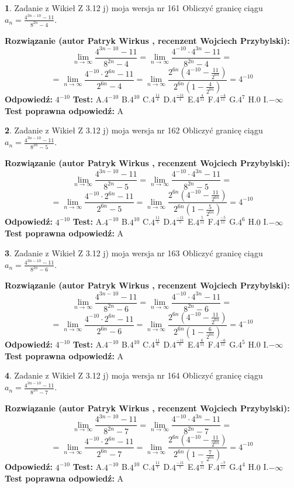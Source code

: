 \documentclass[12pt, a4paper]{article}
\theoremstyle{definition} %
\newtheorem{zad}{}
\newcommand{\zadStart}[1]{\begin{zad}#1\newline}
\newcommand{\zadStop}{\end{zad}}
\newcommand{\rozwStart}[2]{\noindent \textbf{Rozwiązanie (autor #1 , recenzent #2): }\newline}
\newcommand{\rozwStop}{\newline}
\newcommand{\odpStart}{\noindent \textbf{Odpowiedź:}\newline}
\newcommand{\odpStop}{\newline}
\newcommand{\testStart}{\noindent \textbf{Test:}\newline}
\newcommand{\testStop}{\newline}
\newcommand{\kluczStart}{\noindent \textbf{Test poprawna odpowiedź:}\newline}
\newcommand{\kluczStop}{\newline}
\begin{document}
\zadStart{Zadanie z Wikieł Z 3.12 j) moja wersja nr 161}
Obliczyć granicę ciągu $a_{n}=\frac{4^{3n-10}-11}{8^{2n}-4}$.
\zadStop
\rozwStart{Patryk Wirkus}{Wojciech Przybylski}
$$\lim\limits_{n\to\infty}\frac{4^{3n-10}-11}{8^{2n}-4}= \lim\limits_{n\to\infty}\frac{4^{-10} \cdot 4^{3n}-11}{8^{2n}-4}=$$
$$= \lim\limits_{n\to\infty}\frac{4^{-10} \cdot 2^{6n}-11}{2^{6n}-4}= \lim\limits_{n\to\infty}\frac{2^{6n}(4^{-10} - \frac{11}{2^{6n}})}{2^{6n}(1-\frac{4}{2^{6n}})}= 4^{-10}$$
\rozwStop
\odpStart
$4^{-10}$
\odpStop
\testStart
A.$4^{-10}$
B.$4^{10}$
C.$4^{\frac{11}{4}}$
D.$4^{\frac{-11}{4}}$
E.$4^{\frac{4}{11}}$
F.$4^{\frac{-4}{11}}$
G.$4^{7}$
H.$0$
I.$-\infty$
\testStop
\kluczStart
A
\kluczStop



\zadStart{Zadanie z Wikieł Z 3.12 j) moja wersja nr 162}
Obliczyć granicę ciągu $a_{n}=\frac{4^{3n-10}-11}{8^{2n}-5}$.
\zadStop
\rozwStart{Patryk Wirkus}{Wojciech Przybylski}
$$\lim\limits_{n\to\infty}\frac{4^{3n-10}-11}{8^{2n}-5}= \lim\limits_{n\to\infty}\frac{4^{-10} \cdot 4^{3n}-11}{8^{2n}-5}=$$
$$= \lim\limits_{n\to\infty}\frac{4^{-10} \cdot 2^{6n}-11}{2^{6n}-5}= \lim\limits_{n\to\infty}\frac{2^{6n}(4^{-10} - \frac{11}{2^{6n}})}{2^{6n}(1-\frac{5}{2^{6n}})}= 4^{-10}$$
\rozwStop
\odpStart
$4^{-10}$
\odpStop
\testStart
A.$4^{-10}$
B.$4^{10}$
C.$4^{\frac{11}{5}}$
D.$4^{\frac{-11}{5}}$
E.$4^{\frac{5}{11}}$
F.$4^{\frac{-5}{11}}$
G.$4^{6}$
H.$0$
I.$-\infty$
\testStop
\kluczStart
A
\kluczStop



\zadStart{Zadanie z Wikieł Z 3.12 j) moja wersja nr 163}
Obliczyć granicę ciągu $a_{n}=\frac{4^{3n-10}-11}{8^{2n}-6}$.
\zadStop
\rozwStart{Patryk Wirkus}{Wojciech Przybylski}
$$\lim\limits_{n\to\infty}\frac{4^{3n-10}-11}{8^{2n}-6}= \lim\limits_{n\to\infty}\frac{4^{-10} \cdot 4^{3n}-11}{8^{2n}-6}=$$
$$= \lim\limits_{n\to\infty}\frac{4^{-10} \cdot 2^{6n}-11}{2^{6n}-6}= \lim\limits_{n\to\infty}\frac{2^{6n}(4^{-10} - \frac{11}{2^{6n}})}{2^{6n}(1-\frac{6}{2^{6n}})}= 4^{-10}$$
\rozwStop
\odpStart
$4^{-10}$
\odpStop
\testStart
A.$4^{-10}$
B.$4^{10}$
C.$4^{\frac{11}{6}}$
D.$4^{\frac{-11}{6}}$
E.$4^{\frac{6}{11}}$
F.$4^{\frac{-6}{11}}$
G.$4^{5}$
H.$0$
I.$-\infty$
\testStop
\kluczStart
A
\kluczStop



\zadStart{Zadanie z Wikieł Z 3.12 j) moja wersja nr 164}
Obliczyć granicę ciągu $a_{n}=\frac{4^{3n-10}-11}{8^{2n}-7}$.
\zadStop
\rozwStart{Patryk Wirkus}{Wojciech Przybylski}
$$\lim\limits_{n\to\infty}\frac{4^{3n-10}-11}{8^{2n}-7}= \lim\limits_{n\to\infty}\frac{4^{-10} \cdot 4^{3n}-11}{8^{2n}-7}=$$
$$= \lim\limits_{n\to\infty}\frac{4^{-10} \cdot 2^{6n}-11}{2^{6n}-7}= \lim\limits_{n\to\infty}\frac{2^{6n}(4^{-10} - \frac{11}{2^{6n}})}{2^{6n}(1-\frac{7}{2^{6n}})}= 4^{-10}$$
\rozwStop
\odpStart
$4^{-10}$
\odpStop
\testStart
A.$4^{-10}$
B.$4^{10}$
C.$4^{\frac{11}{7}}$
D.$4^{\frac{-11}{7}}$
E.$4^{\frac{7}{11}}$
F.$4^{\frac{-7}{11}}$
G.$4^{4}$
H.$0$
I.$-\infty$
\testStop
\kluczStart
A
\kluczStop
\end{document}
